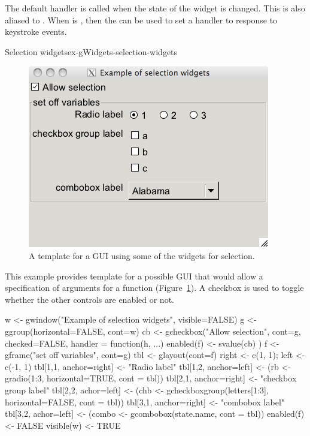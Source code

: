The default handler is called when the state of the widget is
changed. This is also aliased to
. When  is
, then the  can be
used to set a handler to response to keystroke events.


\begin{example}{Selection widgets}{ex-gWidgets-selection-widgets}
\begin{figure}
  \centering
  \includegraphics[width=.5\textwidth]{ex-gWidgets-selection-widgets}
  \caption{A template for a GUI using some of the widgets for selection.}
  \label{fig:ex-gWidgets-selection-widgets}
\end{figure}

This example provides template for a possible GUI that would allow a
specification of arguments for a function
(Figure~\ref{fig:ex-gWidgets-selection-widgets}).  A checkbox is
used to toggle whether the other controls are enabled or not.
\begin{Schunk}
\begin{Sinput}
 w <- gwindow("Example of selection widgets", visible=FALSE)
 g <- ggroup(horizontal=FALSE, cont=w)
 cb <- gcheckbox("Allow selection", cont=g, checked=FALSE, 
                 handler = function(h, ...) {
                   enabled(f) <- svalue(cb)
                 })
 f <- gframe("set off variables", cont=g)
 tbl <- glayout(cont=f)
 right <- c(1, 1); left <- c(-1, 1)
 tbl[1,1, anchor=right] <- "Radio label"
 tbl[1,2, anchor=left] <- (rb <- gradio(1:3, horizontal=TRUE, 
            cont = tbl))
 tbl[2,1, anchor=right] <- "checkbox group label"
 tbl[2,2, achor=left] <- (chb <- gcheckboxgroup(letters[1:3], 
            horizontal=FALSE, cont = tbl))
 tbl[3,1, anchor=right] <- "combobox label"
 tbl[3,2, achor=left] <- (combo <- gcombobox(state.name, 
            cont = tbl))
 enabled(f) <- FALSE                     
 visible(w) <- TRUE
\end{Sinput}
\end{Schunk}
               
    
\end{example}

